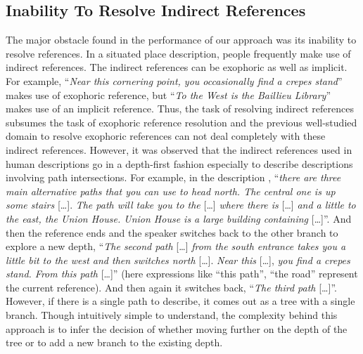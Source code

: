 \documentclass{sig-alternate}
\begin{document}
\subsection{Inability To Resolve Indirect References}
The major obstacle found in the performance of our approach was its inability to resolve references. 
In a situated place description, people frequently make use of indirect references. The
indirect references can be exophoric as well as implicit. For example, ``\textit{Near this cornering point, you occasionally find a crepes stand}''
 makes use of exophoric reference, but ``\textit{To the West is the Baillieu Library}'' makes use of an implicit reference. Thus,
the task of resolving indirect references subsumes the task of exophoric reference resolution and
the previous well-studied domain to resolve exophoric references can not deal completely with these indirect references.
However, it was observed that the indirect references used in human descriptions go in a
depth-first fashion especially to describe descriptions involving path intersections. 
For example, in the description , ``\textit{there are three main
alternative paths that you can use to head north. The central one is up
some stairs} {[}\dots{]}. \textit{The path will take you to the} {[}\dots{]} \textit{where there
is} {[}\dots{]} \textit{and a little to the east, the Union House. Union House is a
large building containing} {[}\dots{]}''. And then the reference ends and the
speaker switches back to the other branch to explore a new depth,
``\textit{The second path} {[}\dots{]} \textit{from the south entrance takes you a little
bit to the west and then switches north} {[}\dots{]}. \textit{Near this} {[}\dots{]},
\textit{you find a crepes stand. From this path }{[}\dots{]}'' (here expressions like
``this path'', ``the road'' represent the current reference). And then
again it switches back, ``\textit{The third path} {[}\dots{]}''.
However, if there is a single path to describe, it comes out as a tree with a single branch.
Though intuitively simple to understand, the complexity behind this approach is to infer the decision of whether moving further on the depth
of the tree or to add a new branch to the existing depth.
\end{document}
